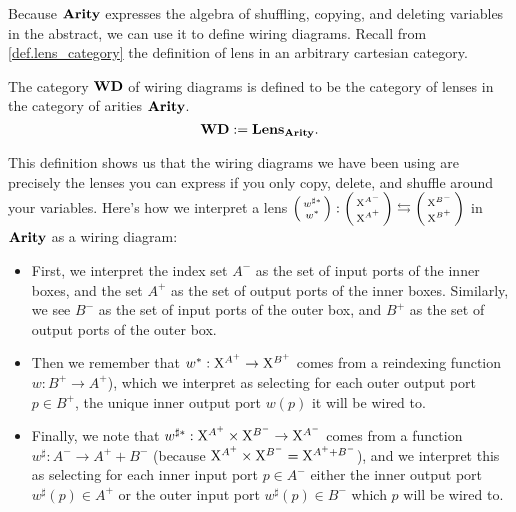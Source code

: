 \documentclass[DynamicalBook]{subfiles}
\begin{document}
Because $\textbf{Arity}$ expresses the algebra of shuffling, copying, and deleting
variables in the abstract, we can use it to define wiring diagrams. Recall from \cref{def.lens_category} the definition of lens in an arbitrary cartesian category.

\begin{definition}\label{def.category_of_wiring_diagrams}
  The category $\textbf{WD}$ of wiring diagrams is defined to be the category of
  lenses in the category of arities $\textbf{Arity}$.
  $$\textbf{WD} := \textbf{Lens}_{\textbf{Arity}}.$$
\end{definition}

This definition shows us that the wiring diagrams we have been using are
precisely the lenses you can express if you only copy, delete, and shuffle
around your variables. Here's how we interpret a lens
$\lens{w^{\sharp\ast}}{w^{\ast}} : \lens{\XX^{A^{-}}}{\XX^{A^+}}
\leftrightarrows \lens{\XX^{B^{-}}}{\XX^{B^+}}$ in $\textbf{Arity}$ as a
wiring diagram:
\begin{itemize}
  \item First, we interpret the index set $A^-$ as the set of input ports of the
    inner boxes, and the set $A^+$ as the set of output ports of the inner
    boxes. Similarly, we see $B^-$ as the set of input ports of the outer box,
    and $B^+$ as the set of output ports of the outer box.
  \item Then we remember that $w^{\ast} :
    \mathrm{X}^{A^+} \to \mathrm{X}^{B^+}$ comes from a reindexing function $w : B^+ \to
    A^+$), which we interpret
    as selecting for each outer output port $p \in B^+$, the unique inner output
    port $w(p)$ it will be wired to.
  \item Finally, we note that $w^{\sharp\ast} : \mathrm{X}^{A^+} \times \mathrm{X}^{B^-} \to
    \mathrm{X}^{A^-}$ comes from a function $w^{\sharp} : A^- \to A^+ + B^-$ (because
    $\mathrm{X}^{A^+} \times \mathrm{X}^{B^-} = \mathrm{X}^{A^+ + B^-}$), and we interpret this as
    selecting for each inner input port $p \in A^-$ either the inner output port
    $w^{\sharp}(p) \in A^+$ or the outer input port
    $w^{\sharp}(p) \in B^-$ which $p$ will be wired to.
\end{itemize}
\end{document}

